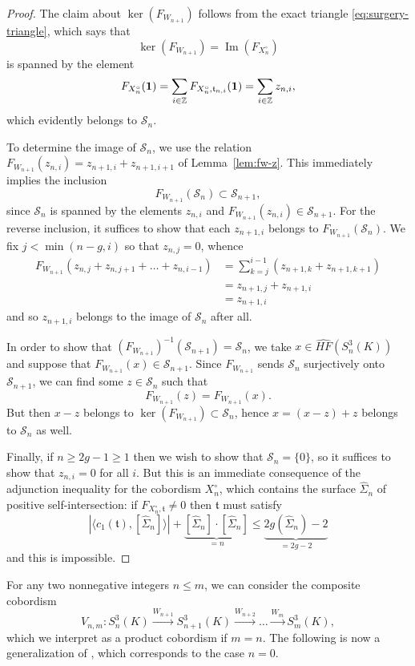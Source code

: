 \documentclass[11pt]{amsart}
\numberwithin{equation}{section}
\numberwithin{theorem}{section}
\theoremstyle{definition}
\newcommand{\Z}{\mathbb{Z}}
\newcommand{\spint}{\mathfrak{t}}
\newcommand{\Img}{\operatorname{Im}}
\newcommand{\cS}{\mathcal{S}}
\newcommand{\hfhat}{\widehat{\mathit{HF}}}
\begin{document}
\begin{proof}
The claim about $\ker(F_{W_{n+1}})$ follows from the exact triangle \eqref{eq:surgery-triangle}, which says that
\[ \ker(F_{W_{n+1}}) = \Img(F_{X^\circ_n}) \]
is spanned by the element
\[ F_{X^\circ_n}({\bf 1}) = \sum_{i \in \Z} F_{X^\circ_n,\spint_{n,i}}({\bf 1}) = \sum_{i\in\Z} z_{n,i}, \]
which evidently belongs to $\cS_n$.

To determine the image of $\cS_n$, we use the relation $F_{W_{n+1}}(z_{n,i}) = z_{n+1,i} + z_{n+1,i+1}$ of Lemma~\ref{lem:fw-z}.  This immediately implies the inclusion
\[ F_{W_{n+1}}(\cS_n) \subset \cS_{n+1}, \]
since $\cS_n$ is spanned by the elements $z_{n,i}$ and $F_{W_{n+1}}(z_{n,i}) \in \cS_{n+1}$.  For the reverse inclusion, it suffices to show that each $z_{n+1,i}$ belongs to $F_{W_{n+1}}(\cS_n)$.  We fix $j < \min(n-g,i)$ so that $z_{n,j} = 0$, whence
\begin{align*}
F_{W_{n+1}}(z_{n,j}+z_{n,j+1}+\dots+z_{n,i-1}) &= \sum_{k=j}^{i-1} (z_{n+1,k}+z_{n+1,k+1}) \\
&= z_{n+1,j} + z_{n+1,i} \\
&= z_{n+1,i}
\end{align*}
and so $z_{n+1,i}$ belongs to the image of $\cS_n$ after all.

In order to show that $(F_{W_{n+1}})^{-1}(\cS_{n+1}) = \cS_n$, we take $x \in \hfhat(S^3_n(K))$ and suppose that $F_{W_{n+1}}(x) \in \cS_{n+1}$.  Since $F_{W_{n+1}}$ sends $\cS_n$ surjectively onto $\cS_{n+1}$, we can find some $z\in\cS_n$ such that
\[ F_{W_{n+1}}(z) = F_{W_{n+1}}(x). \]
But then $x-z$ belongs to $\ker(F_{W_{n+1}}) \subset \cS_n$, hence $x = (x-z)+z$ belongs to $\cS_n$ as well.

Finally, if $n \geq 2g-1 \geq 1$ then we wish to show that $\cS_n=\{0\}$, so it suffices to show that $z_{n,i} = 0$ for all $i$.  But this is an immediate consequence of the adjunction inequality for the cobordism $X^\circ_n$, which contains the surface $\hat\Sigma_n$ of positive self-intersection: if $F_{X^\circ_n,\spint} \neq 0$ then $\spint$ must satisfy
\[ \left| \langle c_1(\spint), [\hat\Sigma_n] \rangle \right| + \underbrace{[\hat\Sigma_n] \cdot [\hat\Sigma_n]}_{=n} \leq \underbrace{2g(\hat\Sigma_n)-2}_{=2g-2} \]
and this is impossible.
\end{proof}

For any two nonnegative integers $n \leq m$, we can consider the composite cobordism
\begin{equation} \label{eq:vmn}
V_{n,m}: S^3_n(K) \xrightarrow{W_{n+1}} S^3_{n+1}(K) \xrightarrow{W_{n+2}} \dots \xrightarrow{W_m} S^3_m(K),
\end{equation}
which we interpret as a product cobordism if $m=n$.  The following is now a generalization of \cite[Proposition~10]{bs-fibered-sqp}, which corresponds to the case $n=0$.
\end{document}
